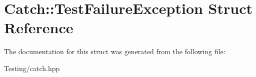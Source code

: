\hypertarget{struct_catch_1_1_test_failure_exception}{\section{Catch\-:\-:Test\-Failure\-Exception Struct Reference}
\label{struct_catch_1_1_test_failure_exception}
}


The documentation for this struct was generated from the following file\-:\begin{DoxyCompactItemize}
\item 
Testing/catch.\-hpp\end{DoxyCompactItemize}

